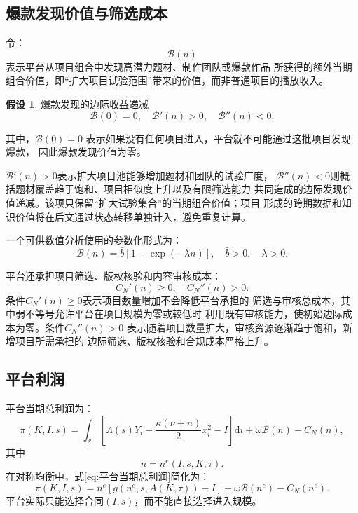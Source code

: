 \documentclass[UTF8, a4paper, 12pt, fontset=fandol]{ctexart}
\theoremstyle{definition}
\newtheorem{assumption}{假设}[section]
\theoremstyle{remark}
\begin{document}
\subsection{爆款发现价值与筛选成本}
令：
\begin{equation*}
  \mathcal{B}(n)
\end{equation*}
表示平台从项目组合中发现高潜力题材、制作团队或爆款作品
所获得的额外当期组合价值，即“扩大项目试验范围”带来的价值，而非普通项目的播放收入。
\begin{assumption}{爆款发现的边际收益递减}
  \begin{equation*}
    \mathcal{B}(0)=0,\quad \mathcal{B}'(n)>0,\quad \mathcal{B}''(n)<0.
  \end{equation*}
\end{assumption}
其中，$\mathcal{B}(0)=0$
表示如果没有任何项目进入，平台就不可能通过这批项目发现爆款，
因此爆款发现价值为零。

$\mathcal{B}'(n)>0$表示扩大项目池能够增加题材和团队的试验广度，
$\mathcal{B}''(n)<0$则概括题材覆盖趋于饱和、项目相似度上升以及有限筛选能力
共同造成的边际发现价值递减。该项只保留“扩大试验集合”的当期组合价值；项目
形成的跨期数据和知识价值将在后文通过状态转移单独计入，避免重复计算。

一个可供数值分析使用的参数化形式为：
\begin{equation*}
  \mathcal{B}(n)=
  \bar{b}[1-\exp(-\lambda n)],
  \quad
  \bar{b}>0,\quad \lambda > 0.
\end{equation*}

平台还承担项目筛选、版权核验和内容审核成本：
\begin{equation*}
  C_N'(n)\ge 0,\quad C_N''(n)>0.
\end{equation*}
条件$C_N'(n)\geq0$表示项目数量增加不会降低平台承担的
筛选与审核总成本，其中弱不等号允许平台在项目规模为零或较低时
利用既有审核能力，使初始边际成本为零。条件$C_N''(n)>0$
表示随着项目数量扩大，审核资源逐渐趋于饱和，新增项目所需承担的
边际筛选、版权核验和合规成本严格上升。
\subsection{平台利润}
平台当期总利润为：
\begin{equation}
  \pi(K,I,s) = 
  \int_\mathcal{E}\left [ \Lambda(s)Y_i 
  - \frac{\kappa(\nu + n)}{2}x_i^2 
  - I \right ] \mathrm{d}i +
  \omega \mathcal{B}(n) - C_N(n),
  \label{eq:平台当期总利润}
\end{equation}
其中
\begin{equation*}
  n = n^e(I,s,K,\tau).
\end{equation*}
在对称均衡中，式\eqref{eq:平台当期总利润}简化为：
\begin{equation*}
  \pi(K,I,s) = 
  n^e[g(n^e,s,A(K,\tau))-I] + 
  \omega \mathcal{B}(n^e)
  - C_N(n^e).
\end{equation*}
平台实际只能选择合同$(I,s)$，而不能直接选择进入规模。
\end{document}
